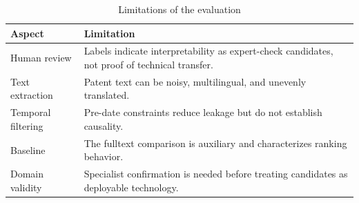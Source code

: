 \begin{table}[tbp]
\centering
\small
\caption{Limitations of the evaluation}
\label{tab:limitations}
\begin{tabular}{ll}
\toprule
Aspect & Limitation \\
\midrule
Human review & Labels indicate interpretability as expert-check candidates, not proof of technical transfer. \\
Text extraction & Patent text can be noisy, multilingual, and unevenly translated. \\
Temporal filtering & Pre-date constraints reduce leakage but do not establish causality. \\
Baseline & The fulltext comparison is auxiliary and characterizes ranking behavior. \\
Domain validity & Specialist confirmation is needed before treating candidates as deployable technology. \\
\bottomrule
\end{tabular}
\end{table}
